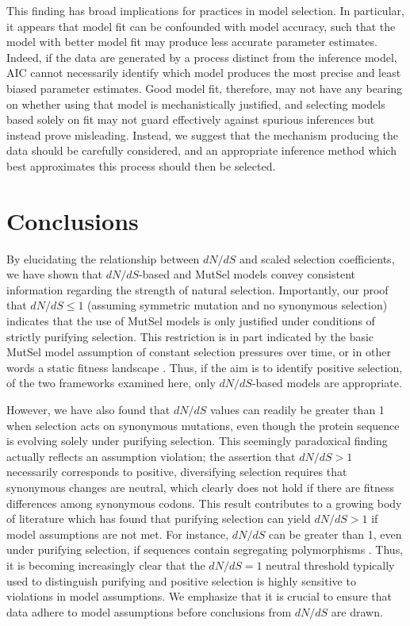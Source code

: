 \documentclass{pnastwo}
\begin{document}
\begin{article}
This finding has broad implications for practices in model selection. In particular, it appears that model fit can be confounded with model accuracy, such that the model with better model fit may produce less accurate parameter estimates. Indeed, if the data are generated by a process distinct from the inference model, AIC cannot necessarily identify which model produces the most precise and least biased parameter estimates. Good model fit, therefore, may not have any bearing on whether using that model is mechanistically justified, and selecting models based solely on fit may not guard effectively against spurious inferences but instead prove misleading. Instead, we suggest that the mechanism producing the data should be carefully considered, and an appropriate inference method which best approximates this process should then be selected. 

\section*{Conclusions}
By elucidating the relationship between $dN/dS$ and scaled selection coefficients, we have shown that $dN/dS$-based and MutSel models convey consistent information regarding the strength of natural selection. Importantly, our proof that $dN/dS \leq 1$ (assuming symmetric mutation and no synonymous selection) indicates that the use of MutSel models is only justified under conditions of strictly purifying selection. This restriction is in part indicated by the basic MutSel model assumption of constant selection pressures over time, or in other words a static fitness landscape \cite{HalpernBruno1998,Thorneetal2007,Rodrigueetal2010,Thorne2012}. Thus, if the aim is to identify positive selection, of the two frameworks examined here, only $dN/dS$-based models are appropriate. 

However, we have also found that $dN/dS$ values can readily be greater than 1 when selection acts on synonymous mutations, even though the protein sequence is evolving solely under purifying selection. This seemingly paradoxical finding actually reflects an assumption violation; the assertion that $dN/dS > 1$ necessarily corresponds to positive, diversifying selection requires that synonymous changes are neutral, which clearly does not hold if there are fitness differences among synonymous codons. This result contributes to a growing body of literature which has found that purifying selection can yield $dN/dS > 1$ if model assumptions are not met. For instance, $dN/dS$ can be greater than 1, even under purifying selection, if sequences contain segregating polymorphisms \cite{Rochaetal2006,KryazhimskiyPlotkin2008,Mugaletal2014}. Thus, it is becoming increasingly clear that the $dN/dS = 1$ neutral threshold typically used to distinguish purifying and positive selection is highly sensitive to violations in model assumptions. We emphasize that it is crucial to ensure that data adhere to model assumptions before conclusions from $dN/dS$ are drawn.


\end{article}
\end{document}
